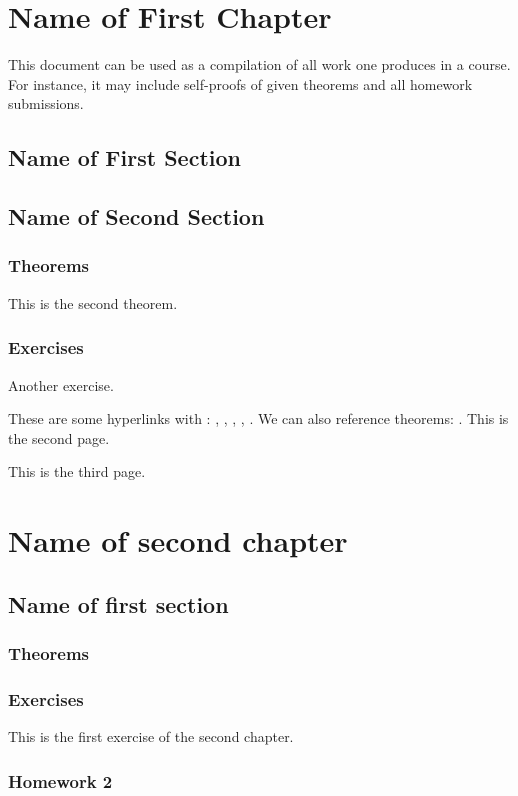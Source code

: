 \documentclass[11pt, a4paper]{book}
\begin{document}
\frontmatter
%

%
\tableofcontents
\thispagestyle{empty}
\newpage
\setcounter{page}{1}
%
\mainmatter
\chapter{Name of First Chapter}
This document can be used as a compilation of all work one produces in a course. For instance, it may include self-proofs of given theorems and all homework submissions.
%
\section{Name of First Section}
%
\section{Name of Second Section}
\subsection{Theorems}
\begin{theorem}
    This is the second theorem.
\end{theorem}
\subsection{Exercises}
\begin{exercise}\label{ex:1.2}
    Another exercise.
\end{exercise}
These are some hyperlinks with : , , , , . We can also reference theorems: . 
\newpage
This is the second page.

\newpage
This is the third page.
%
%
\chapter{Name of second chapter}
%
\section{Name of first section}
\subsection{Theorems}
\subsection{Exercises}
\begin{exercise}
    This is the first exercise of the second chapter.
\end{exercise}
\subsection{Homework 2}
\backmatter
\end{document}
